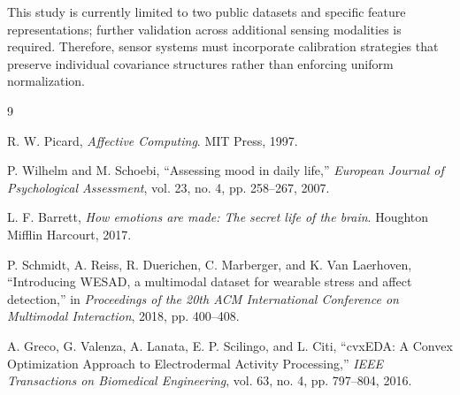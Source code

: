 \documentclass{IEEE_lsens}
\begin{document}
This study is currently limited to two public datasets and specific feature representations; further validation across additional sensing modalities is required. Therefore, sensor systems must incorporate calibration strategies that preserve individual covariance structures rather than enforcing uniform normalization.


\begin{thebibliography}{9}

R. W. Picard, \textit{Affective Computing}. MIT Press, 1997.

P. Wilhelm and M. Schoebi, ``Assessing mood in daily life,'' \textit{European Journal of Psychological Assessment}, vol. 23, no. 4, pp. 258--267, 2007.

L. F. Barrett, \textit{How emotions are made: The secret life of the brain}. Houghton Mifflin Harcourt, 2017.

P. Schmidt, A. Reiss, R. Duerichen, C. Marberger, and K. Van Laerhoven, ``Introducing WESAD, a multimodal dataset for wearable stress and affect detection,'' in \textit{Proceedings of the 20th ACM International Conference on Multimodal Interaction}, 2018, pp. 400--408.

A. Greco, G. Valenza, A. Lanata, E. P. Scilingo, and L. Citi, ``cvxEDA: A Convex Optimization Approach to Electrodermal Activity Processing,'' \textit{IEEE Transactions on Biomedical Engineering}, vol. 63, no. 4, pp. 797--804, 2016.

\end{thebibliography}
\end{document}
